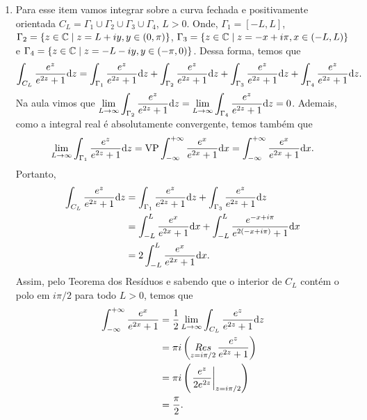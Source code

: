 \begin{questions}
\begin{solution}
\begin{enumerate}[label=(\alph*)]
      \item Para esse item vamos integrar sobre a curva fechada e positivamente orientada $C_L = \Gamma_1 \cup \Gamma_2 \cup \Gamma_3 \cup \Gamma_4$, $L>0$. Onde, $\Gamma_1 = [-L,L]$, $\Gamma_2 = \{z\in{\mathbb C} \mid z = L + iy, y\in(0,\pi)\}$, $\Gamma_3 = \{z\in{\mathbb C} \mid z = -x + i\pi, x\in(-L,L)\}$ e $\Gamma_4 = \{z\in{\mathbb C} \mid z = -L - iy, y\in(-\pi,0)\}$.
      Dessa forma, temos que
      \begin{align*}
        \int_{C_L} \frac{e^z}{e^{2z} + 1} \mathrm{d} z = \int_{\Gamma_1} \frac{e^z}{e^{2z} + 1} \mathrm{d} z + \int_{\Gamma_2} \frac{e^z}{e^{2z} + 1} \mathrm{d} z + \int_{\Gamma_3} \frac{e^z}{e^{2z} + 1} \mathrm{d} z + \int_{\Gamma_4} \frac{e^z}{e^{2z} + 1} \mathrm{d} z.
      \end{align*}
      Na aula vimos que $\displaystyle \lim_{L\to\infty} \int_{\Gamma_2} \frac{e^z}{e^{2z} + 1} \mathrm{d} z = \lim_{L\to\infty} \int_{\Gamma_4} \frac{e^z}{e^{2z} + 1} \mathrm{d} z = 0$.
    Ademais, como a integral real é absolutamente convergente, temos também que
    \begin{align*}
    \lim_{L\to\infty} \int_{\Gamma_1} \frac{e^z}{e^{2z} + 1} \mathrm{d} z = \mathrm{VP}\int_{-\infty}^{+\infty} \frac{e^x}{e^{2x} + 1} \mathrm{d} x = \int_{-\infty}^{+\infty} \frac{e^x}{e^{2x} + 1} \mathrm{d} x.
    \end{align*}
    Portanto, 
    \begin{align*}
        \int_{C_L} \frac{e^z}{e^{2z} + 1} \mathrm{d} z 
            &= \int_{\Gamma_1} \frac{e^z}{e^{2z} + 1} \mathrm{d} z + \int_{\Gamma_3} \frac{e^z}{e^{2z} + 1} \mathrm{d} z\\
            &= \int_{-L}^L \frac{e^x}{e^{2x} + 1} \mathrm{d} x + \int_{-L}^L \frac{e^{-x+i\pi}}{e^{2(-x+i\pi)} + 1} \mathrm{d} x\\
            &= 2\int_{-L}^L \frac{e^x}{e^{2x} + 1} \mathrm{d} x.
    \end{align*}
      Assim, pelo Teorema dos Resíduos e sabendo que o interior de $C_L$ contém o polo em $i\pi/2$ para todo $L>0$, temos que
      \begin{align*}
          \int_{-\infty}^{+\infty} \frac{e^x}{e^{2x} + 1} &= \frac{1}{2} \lim_{L\to\infty} \int_{C_L} \frac{e^z}{e^{2z} + 1} \mathrm{d} z \\
                &= \pi i \left( \mathop{Res}\limits_{z = i\pi/2} \frac{e^z}{e^{2z} + 1} \right) \\
                &= \pi i \left( \left. \frac{e^z}{2e^{2z}} \right|_{z=i\pi/2} \right) \\
                &= \frac{\pi}{2}.
      \end{align*}


\end{enumerate}
\end{solution}
\end{questions}
